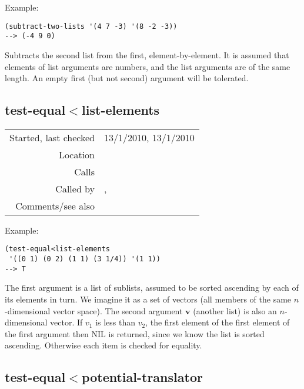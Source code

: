 \vspace{0.5cm}
\noindent Example:
\begin{verbatim}
(subtract-two-lists '(4 7 -3) '(8 -2 -3))
--> (-4 9 0)
\end{verbatim}

\noindent Subtracts the second list from the first,
element-by-element. It is assumed that elements of
list arguments are numbers, and the list arguments are
of the same length. An empty first (but not second)
argument will be tolerated.


\subsection*{test-equal$<$list-elements}\label{fun:test-equal<list-elements}

\vspace{0.3cm}
\begin{tabular}{r|p{8cm}}
Started, last checked & 13/1/2010, 13/1/2010 \\
Location & \nameref{sec:set-operations} \\
Calls & \\
Called by & \nameref{fun:intersection-multidimensional},\newline \nameref{fun:set-difference-multidimensional-sorted-asc} \\
Comments/see also &
\end{tabular}

\vspace{0.5cm}
\noindent Example:
\begin{verbatim}
(test-equal<list-elements
 '((0 1) (0 2) (1 1) (3 1/4)) '(1 1))
--> T
\end{verbatim}

\noindent The first argument is a list of sublists,
assumed to be sorted ascending by each of its elements
in turn. We imagine it as a set of vectors (all
members of the same $n$-dimensional vector space). The
second argument $\mathbf{v}$ (another list) is also an
$n$-dimensional vector. If $v_1$ is less than $v_2$,
the first element of the first element of the first
argument then NIL is returned, since we know the list
is sorted ascending. Otherwise each item is checked
for equality.


\subsection*{test-equal$<$potential-translator}\label{fun:test-equal<potential-translator}

